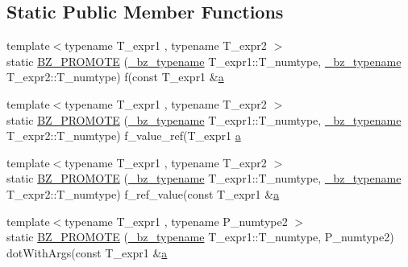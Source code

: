 \subsection*{Static Public Member Functions}
\begin{DoxyCompactItemize}
\item 
{\footnotesize template$<$typename T\+\_\+expr1 , typename T\+\_\+expr2 $>$ }\\static \hyperlink{class__bz__meta__vectorDot_a4d3e2779f135fad87aa6d47e6d9aac61}{B\+Z\+\_\+\+P\+R\+O\+M\+O\+T\+E} (\hyperlink{compiler_8h_a1bc40add3e72effc9cf69dbe445cbdfd}{\+\_\+bz\+\_\+typename} T\+\_\+expr1\+::\+T\+\_\+numtype, \hyperlink{compiler_8h_a1bc40add3e72effc9cf69dbe445cbdfd}{\+\_\+bz\+\_\+typename} T\+\_\+expr2\+::\+T\+\_\+numtype) f(const T\+\_\+expr1 \&\hyperlink{gen__mat5files_8m_aae328bf20413f220e38aec4d95bfd6da}{a}
\item 
{\footnotesize template$<$typename T\+\_\+expr1 , typename T\+\_\+expr2 $>$ }\\static \hyperlink{class__bz__meta__vectorDot_ab9b062de2876de1bcd367849d92d55e1}{B\+Z\+\_\+\+P\+R\+O\+M\+O\+T\+E} (\hyperlink{compiler_8h_a1bc40add3e72effc9cf69dbe445cbdfd}{\+\_\+bz\+\_\+typename} T\+\_\+expr1\+::\+T\+\_\+numtype, \hyperlink{compiler_8h_a1bc40add3e72effc9cf69dbe445cbdfd}{\+\_\+bz\+\_\+typename} T\+\_\+expr2\+::\+T\+\_\+numtype) f\+\_\+value\+\_\+ref(T\+\_\+expr1 \hyperlink{gen__mat5files_8m_aae328bf20413f220e38aec4d95bfd6da}{a}
\item 
{\footnotesize template$<$typename T\+\_\+expr1 , typename T\+\_\+expr2 $>$ }\\static \hyperlink{class__bz__meta__vectorDot_a95fa9170598b64b92e7d64978bd25153}{B\+Z\+\_\+\+P\+R\+O\+M\+O\+T\+E} (\hyperlink{compiler_8h_a1bc40add3e72effc9cf69dbe445cbdfd}{\+\_\+bz\+\_\+typename} T\+\_\+expr1\+::\+T\+\_\+numtype, \hyperlink{compiler_8h_a1bc40add3e72effc9cf69dbe445cbdfd}{\+\_\+bz\+\_\+typename} T\+\_\+expr2\+::\+T\+\_\+numtype) f\+\_\+ref\+\_\+value(const T\+\_\+expr1 \&\hyperlink{gen__mat5files_8m_aae328bf20413f220e38aec4d95bfd6da}{a}
\item 
{\footnotesize template$<$typename T\+\_\+expr1 , typename P\+\_\+numtype2 $>$ }\\static \hyperlink{class__bz__meta__vectorDot_a4e04e43201062d7052873f07fd805bf2}{B\+Z\+\_\+\+P\+R\+O\+M\+O\+T\+E} (\hyperlink{compiler_8h_a1bc40add3e72effc9cf69dbe445cbdfd}{\+\_\+bz\+\_\+typename} T\+\_\+expr1\+::\+T\+\_\+numtype, P\+\_\+numtype2) dot\+With\+Args(const T\+\_\+expr1 \&\hyperlink{gen__mat5files_8m_aae328bf20413f220e38aec4d95bfd6da}{a}
\end{DoxyCompactItemize}
